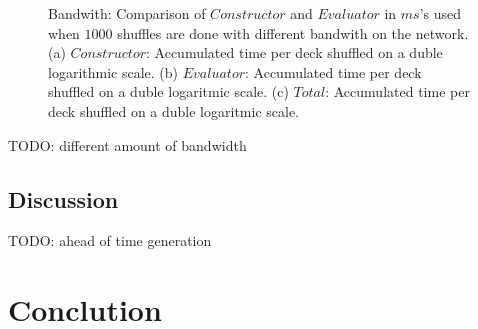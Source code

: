 \documentclass[twoside,11pt,openright]{report}
\newcommand{\todo}[1]{}
\renewcommand{\todo}[1]{{\color{red} TODO: {#1}} \\}
\begin{document}
\begin{figure}
    \begin{subfigure}{\textwidth}
        \centering
        \caption{}
        \label{fig:total_bandwith_plot}
    \end{subfigure}
    \caption{Bandwith: Comparison of $Constructor$ and $Evaluator$ in $ms$'s used when $1000$ shuffles are done with different bandwith on the network. (a) $Constructor$: Accumulated time per deck shuffled on a duble logarithmic scale. (b) $Evaluator$: Accumulated time per deck shuffled on a duble logaritmic scale. (c) $Total$: Accumulated time per deck shuffled on a duble logaritmic scale.}
    \label{fig:mesurement_bandwith}
\end{figure}

\todo{different amount of bandwidth}

\section{Discussion}
\label{sec:discussion}

\todo{ahead of time generation}



\chapter{Conclution}
\label{ch:conclution}

\end{document}
